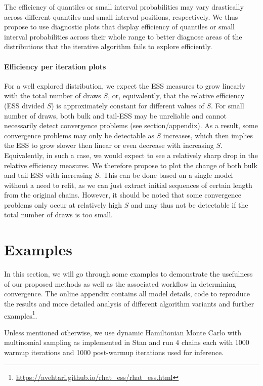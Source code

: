 \documentclass[american,]{article}
\let\oldparagraph\paragraph
\renewcommand{\paragraph}[1]{\oldparagraph{#1}\mbox{}}
\let\rmarkdownfootnote\footnote%
\def\footnote{\protect\rmarkdownfootnote}
\begin{document}
The efficiency of quantiles or small interval probabilities may vary
drastically across different quantiles and small interval positions,
respectively. We thus propose to use diagnostic plots that display
efficiency of quantiles or small interval probabilities across their
whole range to better diagnose areas of the distributions that the
iterative algorithm fails to explore efficiently.

\hypertarget{efficiency-change-plots}{%
\paragraph{Efficiency per iteration plots}\label{efficiency-change-plots}}

For a well explored distribution, we expect the ESS measures to grow
linearly with the total number of draws \(S\), or, equivalently, that
the relative efficiency (ESS divided \(S\)) is approximately constant
for different values of \(S\). For small number of draws, both bulk and
tail-ESS may be unreliable and cannot necessarily detect convergence
problems (see section/appendix). As a result, some convergence problems may only be
detectable as \(S\) increases, which then implies the ESS to grow slower
then linear or even decrease with increasing \(S\). Equivalently, in
such a case, we would expect to see a relatively sharp drop in the
relative efficiency measures. We therefore propose to plot the change of
both bulk and tail ESS with increasing \(S\). This can be done based on
a single model without a need to refit, as we can just extract initial
sequences of certain length from the original chains. However, it should
be noted that some convergence problems only occur at relatively high
\(S\) and may thus not be detectable if the total number of draws is too
small.

\hypertarget{examples}{%
\section{Examples}\label{examples}}

In this section, we will go through some examples to demonstrate the
usefulness of our proposed methods as well as the associated workflow
in determining convergence. The online appendix contains all model
details, code to reproduce the results and more detailed analysis of
different algorithm variants and further
examples\footnote{\url{https://avehtari.github.io/rhat_ess/rhat_ess.html}}.

Unless mentioned otherwise, we use dynamic Hamiltonian Monte Carlo with
multinomial sampling \citep{betancourt2017conceptual} as implemented
in Stan \citep{StanManual.2.18.0} and run 4 chains each with 1000
warmup iterations and 1000 post-warmup iterations used for inference.
\end{document}
